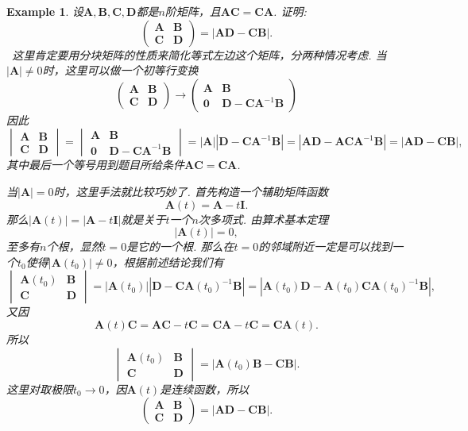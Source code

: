 \documentclass{article}
\newtheorem{example}[theorem]{Example}
\newcommand{\hints}{{\color{blue} \text{hints}}}
\newcommand{\mbf}[1]{\bm{#1}}
\begin{document}
\begin{example}
\rm 设$\mbf{A},\mbf{B},\mbf{C},\mbf{D}$都是$n$阶矩阵，且$\mbf{A}\mbf{C} = \mbf{C}\mbf{A}$. 证明:
$$
\begin{pmatrix}
\mbf{A} & \mbf{B} \\
\mbf{C} & \mbf{D}
\end{pmatrix} = |\mbf{AD} - \mbf{CB}|. 
$$
\hints\ 这里肯定要用分块矩阵的性质来简化等式左边这个矩阵，分两种情况考虑. 当$|\mbf{A}| \neq 0$时，这里可以做一个初等行变换
$$
\begin{pmatrix}
\mbf{A} & \mbf{B} \\
\mbf{C} & \mbf{D}
\end{pmatrix} \to 
\begin{pmatrix}
\mbf{A} & \mbf{B} \\
\mbf{0} & \mbf{D}-\mbf{C}\mbf{A}^{-1}\mbf{B} 
\end{pmatrix}
$$
因此
$$
\begin{vmatrix}
\mbf{A} & \mbf{B} \\
\mbf{C} & \mbf{D}
\end{vmatrix} = \begin{vmatrix}
\mbf{A} & \mbf{B} \\
\mbf{0} & \mbf{D}-\mbf{C}\mbf{A}^{-1}\mbf{B} 
\end{vmatrix} =|\mbf{A}||\mbf{D}-\mbf{C}\mbf{A}^{-1}\mbf{B}|=|\mbf{AD}-\mbf{AC}\mbf{A}^{-1}\mbf{B}| = |\mbf{AD}-\mbf{CB}|,
$$
其中最后一个等号用到题目所给条件$\mbf{A}\mbf{C} = \mbf{C}\mbf{A}$. 

当$|\mbf{A}| = 0$时，这里手法就比较巧妙了. 首先构造一个辅助矩阵函数
$$
\mbf{A}(t) = \mbf{A}-t\mbf{I}.
$$
那么$|\mbf{A}(t)| = |\mbf{A}-t\mbf{I}|$就是关于$t$一个$n$次多项式. 由算术基本定理
$$
|\mbf{A}(t)| = 0,
$$
至多有$n$个根，显然$t = 0$是它的一个根. 那么在$t = 0$的邻域附近一定是可以找到一个$t_0$使得$|\mbf{A}(t_0)| \neq 0$，根据前述结论我们有
$$
\begin{vmatrix}
\mbf{A}(t_0) & \mbf{B} \\
\mbf{C} & \mbf{D}
\end{vmatrix} = |\mbf{A}(t_0)||\mbf{D}-\mbf{C}\mbf{A}(t_0)^{-1}\mbf{B}|=|\mbf{A}(t_0)\mbf{D}-\mbf{A}(t_0)\mbf{C}\mbf{A}(t_0)^{-1}\mbf{B}|,
$$
又因
$$
\mbf{A}(t)\mbf{C} = \mbf{AC} - t\mbf{C} = \mbf{CA}-t\mbf{C} = \mbf{C}\mbf{A}(t). 
$$
所以
$$
\begin{vmatrix}
\mbf{A}(t_0) & \mbf{B} \\
\mbf{C} & \mbf{D}
\end{vmatrix}  = |\mbf{A}(t_0)\mbf{B}- \mbf{C}\mbf{B}|.
$$
这里对取极限$t_0 \to 0$，因$\mbf{A}(t)$是连续函数，所以
$$
\begin{pmatrix}
\mbf{A} & \mbf{B} \\
\mbf{C} & \mbf{D}
\end{pmatrix} = |\mbf{AD} - \mbf{CB}|. 
$$
\end{example}
\end{document}
